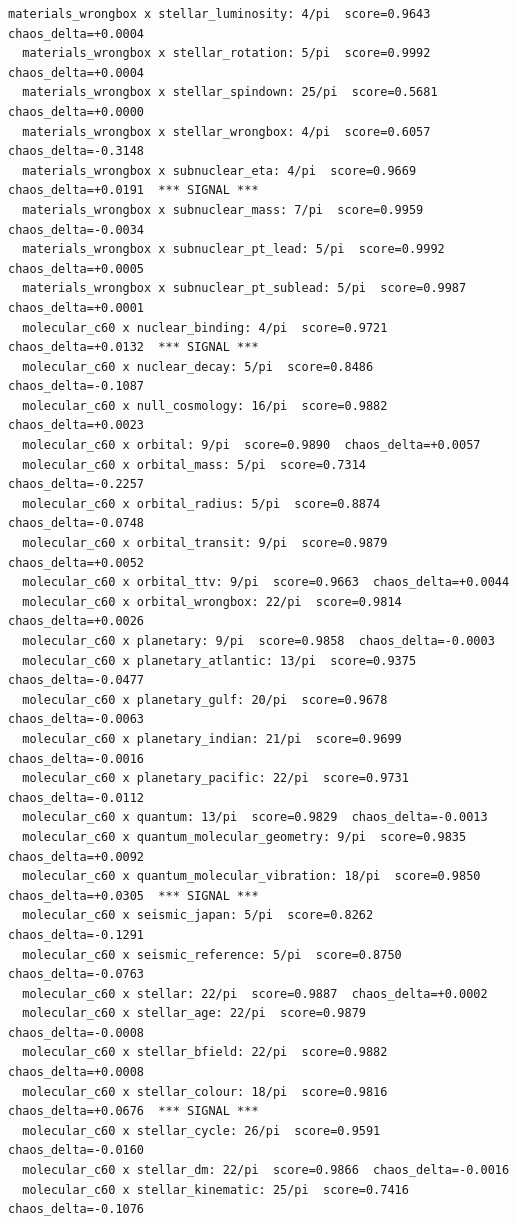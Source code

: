 \documentclass[11pt, letterpaper, openany]{book}
\begin{document}
\begin{empiricalbox}
\begin{lstlisting}[style=terminal]
  materials_wrongbox x stellar_luminosity: 4/pi  score=0.9643  chaos_delta=+0.0004
  materials_wrongbox x stellar_rotation: 5/pi  score=0.9992  chaos_delta=+0.0004
  materials_wrongbox x stellar_spindown: 25/pi  score=0.5681  chaos_delta=+0.0000
  materials_wrongbox x stellar_wrongbox: 4/pi  score=0.6057  chaos_delta=-0.3148
  materials_wrongbox x subnuclear_eta: 4/pi  score=0.9669  chaos_delta=+0.0191  *** SIGNAL ***
  materials_wrongbox x subnuclear_mass: 7/pi  score=0.9959  chaos_delta=-0.0034
  materials_wrongbox x subnuclear_pt_lead: 5/pi  score=0.9992  chaos_delta=+0.0005
  materials_wrongbox x subnuclear_pt_sublead: 5/pi  score=0.9987  chaos_delta=+0.0001
  molecular_c60 x nuclear_binding: 4/pi  score=0.9721  chaos_delta=+0.0132  *** SIGNAL ***
  molecular_c60 x nuclear_decay: 5/pi  score=0.8486  chaos_delta=-0.1087
  molecular_c60 x null_cosmology: 16/pi  score=0.9882  chaos_delta=+0.0023
  molecular_c60 x orbital: 9/pi  score=0.9890  chaos_delta=+0.0057
  molecular_c60 x orbital_mass: 5/pi  score=0.7314  chaos_delta=-0.2257
  molecular_c60 x orbital_radius: 5/pi  score=0.8874  chaos_delta=-0.0748
  molecular_c60 x orbital_transit: 9/pi  score=0.9879  chaos_delta=+0.0052
  molecular_c60 x orbital_ttv: 9/pi  score=0.9663  chaos_delta=+0.0044
  molecular_c60 x orbital_wrongbox: 22/pi  score=0.9814  chaos_delta=+0.0026
  molecular_c60 x planetary: 9/pi  score=0.9858  chaos_delta=-0.0003
  molecular_c60 x planetary_atlantic: 13/pi  score=0.9375  chaos_delta=-0.0477
  molecular_c60 x planetary_gulf: 20/pi  score=0.9678  chaos_delta=-0.0063
  molecular_c60 x planetary_indian: 21/pi  score=0.9699  chaos_delta=-0.0016
  molecular_c60 x planetary_pacific: 22/pi  score=0.9731  chaos_delta=-0.0112
  molecular_c60 x quantum: 13/pi  score=0.9829  chaos_delta=-0.0013
  molecular_c60 x quantum_molecular_geometry: 9/pi  score=0.9835  chaos_delta=+0.0092
  molecular_c60 x quantum_molecular_vibration: 18/pi  score=0.9850  chaos_delta=+0.0305  *** SIGNAL ***
  molecular_c60 x seismic_japan: 5/pi  score=0.8262  chaos_delta=-0.1291
  molecular_c60 x seismic_reference: 5/pi  score=0.8750  chaos_delta=-0.0763
  molecular_c60 x stellar: 22/pi  score=0.9887  chaos_delta=+0.0002
  molecular_c60 x stellar_age: 22/pi  score=0.9879  chaos_delta=-0.0008
  molecular_c60 x stellar_bfield: 22/pi  score=0.9882  chaos_delta=+0.0008
  molecular_c60 x stellar_colour: 18/pi  score=0.9816  chaos_delta=+0.0676  *** SIGNAL ***
  molecular_c60 x stellar_cycle: 26/pi  score=0.9591  chaos_delta=-0.0160
  molecular_c60 x stellar_dm: 22/pi  score=0.9866  chaos_delta=-0.0016
  molecular_c60 x stellar_kinematic: 25/pi  score=0.7416  chaos_delta=-0.1076

\end{lstlisting}
\end{empiricalbox}
\end{document}
